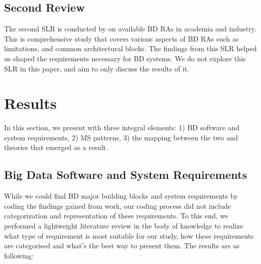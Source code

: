 \documentclass[a4paper,11pt,article,oneside]{memoir}
\begin{document}



\section{Second Review}

The second SLR is conducted by \citet{ataei2022state} on available BD RAs in academia and industry. This is comprehensive study that covers various aspects of BD RAs such as limitations, and common architectural blocks. The findings from this SLR helped us shaped the requirements necessary for BD systems. We do not explore this SLR in this paper, and aim to only discuss the results of it.






\chapter{Results}


In this section, we present with three integral elements: 1) BD software and system requirements, 2) MS patterns, 3) the mapping between the two and theories that emerged as a result.  

\section{Big Data Software and System Requirements}\label{requirements}

While we could find BD major building blocks and system requirements by coding the findings gained from \citet{ataei2022state} work, our coding process did not include categorization and representation of these requirements. To this end, we performed a lightweight literature review in the body of knowledge to realize what type of requirement is most suitable for our study, how these requirements are categorised and what's the best way to present them. The results are as following:
\end{document}
